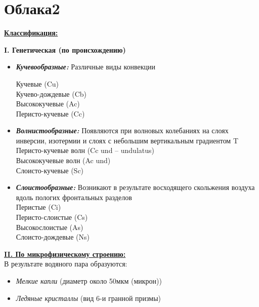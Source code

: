 
\section{Облака2}
\par \underline{\textbf{Классификация:}}\\
\par \textbf{I. Генетическая (по происхождению)}

\begin{itemize}
	\item \textbf{\textit{Кучевообразные:}} Различные виды конвекции\\
{
	\setlength{\columnseprule}{0pt}
\begin{multicols*}{2} 	Кучевые (Cu)\\
	Кучево-дождевые (Cb)\\
	Высококучевые (Ac)\\
	Перисто-кучевые (Cc)
\end{multicols*}
}
	\item \textbf{\textit{Волнистообразные:}} Появляются при волновых колебаниях на слоях инверсии, изотермии и слоях с небольшим вертикальным градиентом T\\
	Перисто-кучевые волн (Cc und – undulatus)\\
	Высококучевые волн (Ac und)\\
	Слоисто-кучевые (Sc)\\
	\item \textbf{\textit{Слоистообразные:}} Возникают в результате восходящего скольжения воздуха вдоль пологих фронтальных разделов  \\
	Перистые (Ci)\\
	Перисто-слоистые (Cs)\\
	Высокослоистые (As)\\
	Слоисто-дождевые (Ns)
\end{itemize}



\par\underline{\textbf{II. По микрофизическому строению:}}\\
В результате водяного пара образуются:

\begin{itemize}
\item \textit{Мелкие капли} (диаметр около 50мкм (микрон))
\item \textit{Ледяные кристаллы} (вид 6-и гранной призмы)
\end{itemize}

